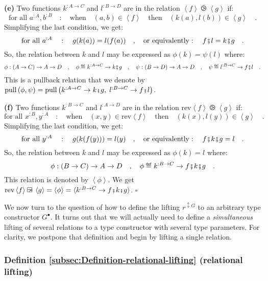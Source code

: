 \textbf{(e)} Two functions $k^{:A\rightarrow C}$ and $l^{:B\rightarrow D}$
are in the relation $\left<f\right>\ogreaterthan\left<g\right>$ if:
\[
\text{for all }a^{:A},b^{:B}\quad:\quad\text{when}\quad(a,b)\in\left<f\right>\quad\text{then}\quad(k(a),l(b))\in\left<g\right>\quad.
\]
Simplifying the last condition, we get:
\[
\text{for all }a^{:A}\quad:\quad g(k(a))=l(f(a))\quad,\quad\text{or equivalently}:\quad f\bef l=k\bef g\quad.
\]
So, the relation between $k$ and $l$ may be expressed as $\phi(k)=\psi(l)$
where: 
\[
\phi:\left(A\rightarrow C\right)\rightarrow A\rightarrow D\quad,\quad\phi\triangleq k^{:A\rightarrow C}\rightarrow k\bef g\quad,\quad\psi:\left(B\rightarrow D\right)\rightarrow A\rightarrow D\quad,\quad\psi\triangleq l^{:B\rightarrow C}\rightarrow f\bef l\quad.
\]
 This is a pullback relation that we denote by $\text{pull}\,(\phi,\psi)=\text{pull}\,\big(k^{:A\rightarrow C}\rightarrow k\bef g,\;l^{:B\rightarrow C}\rightarrow f\bef l\big)$.

\textbf{(f)} Two functions $k^{:B\rightarrow C}$ and $l^{:A\rightarrow D}$
are in the relation $\text{rev}\left<f\right>\ogreaterthan\left<g\right>$
if:
\[
\text{for all }x^{:B},y^{:A}\quad:\quad\text{when}\quad(x,y)\in\text{rev}\left<f\right>\quad\text{then}\quad(k(x),l(y))\in\left<g\right>\quad.
\]
Simplifying the last condition, we get:
\[
\text{for all }y^{:A}\quad:\quad g(k(f(y)))=l(y)\quad,\quad\text{or equivalently}:\quad f\bef k\bef g=l\quad.
\]
So, the relation between $k$ and $l$ may be expressed as $\phi(k)=l$
where: 
\[
\phi:\left(B\rightarrow C\right)\rightarrow A\rightarrow D\quad,\quad\phi\triangleq k^{:B\rightarrow C}\rightarrow f\bef k\bef g\quad.
\]
 This relation is denoted by $\left<\phi\right>$. We get $\text{rev}\left<f\right>\ogreaterthan\left<g\right>=\left<\phi\right>=\langle k^{:B\rightarrow C}\rightarrow f\bef k\bef g\rangle$.
$\square$

We now turn to the question of how to define the lifting $r^{\updownarrow G}$
to an arbitrary type constructor $G^{\bullet}$. It turns out that
we will actually need to define a \emph{simultaneous} lifting of several
relations to a type constructor with several type parameters. For
clarity, we postpone that definition and begin by lifting a single
relation.

\subsubsection{Definition \label{subsec:Definition-relational-lifting}\ref{subsec:Definition-relational-lifting}
(relational lifting)}

